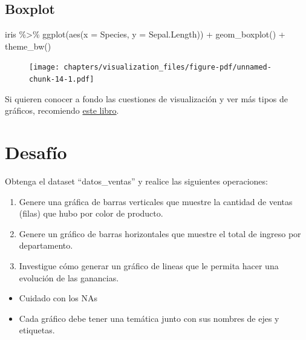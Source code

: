 \documentclass[
  letterpaper,
  DIV=11,
  numbers=noendperiod]{scrreprt}
\newenvironment{Shaded}{\begin{snugshade}}{\end{snugshade}}
\newcommand{\AttributeTok}[1]{\textcolor[rgb]{0.40,0.45,0.13}{#1}}
\newcommand{\FunctionTok}[1]{\textcolor[rgb]{0.28,0.35,0.67}{#1}}
\newcommand{\NormalTok}[1]{\textcolor[rgb]{0.00,0.23,0.31}{#1}}
\newcommand{\SpecialCharTok}[1]{\textcolor[rgb]{0.37,0.37,0.37}{#1}}
\providecommand{\tightlist}{%
  \setlength{\itemsep}{0pt}\setlength{\parskip}{0pt}}\usepackage{longtable,booktabs,array}
\begin{document}
\hypertarget{boxplot}{%
\subsection{Boxplot}\label{boxplot}}

\begin{Shaded}
\begin{Highlighting}[]
\NormalTok{iris }\SpecialCharTok{\%\textgreater{}\%} 
  \FunctionTok{ggplot}\NormalTok{(}\FunctionTok{aes}\NormalTok{(}\AttributeTok{x =}\NormalTok{ Species, }\AttributeTok{y =}\NormalTok{ Sepal.Length)) }\SpecialCharTok{+}
  \FunctionTok{geom\_boxplot}\NormalTok{() }\SpecialCharTok{+}
  \FunctionTok{theme\_bw}\NormalTok{()}
\end{Highlighting}
\end{Shaded}

\begin{figure}[H]

{\centering \texttt{[image: chapters/visualization\_files/figure-pdf/unnamed-chunk-14-1.pdf]}

}

\end{figure}

Si quieren conocer a fondo las cuestiones de visualización y ver más
tipos de gráficos, recomiendo
\href{https://r-graphics.org/index.html}{este libro}.

\hypertarget{desafuxedo-3}{%
\section{Desafío}\label{desafuxedo-3}}

Obtenga el dataset ``datos\_ventas'' y realice las siguientes
operaciones:

\begin{enumerate}
\def\labelenumi{\arabic{enumi}.}
\tightlist
\item
  Genere una gráfica de barras verticales que muestre la cantidad de
  ventas (filas) que hubo por color de producto.
\item
  Genere un gráfico de barras horizontales que muestre el total de
  ingreso por departamento.
\item
  Investigue cómo generar un gráfico de lineas que le permita hacer una
  evolución de las ganancias.
\end{enumerate}

\begin{itemize}
\item
  Cuidado con los NAs
\item
  Cada gráfico debe tener una temática junto con sus nombres de ejes y
  etiquetas.
\end{itemize}
\end{document}
